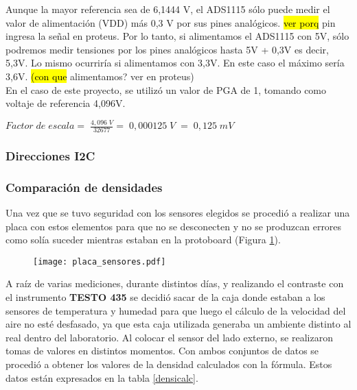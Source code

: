 Aunque la mayor referencia sea de 6,1444 V, el ADS1115 sólo puede medir el valor de alimentación (VDD) más 0,3 V por sus pines analógicos. \hl{ver porq} pin ingresa la señal en proteus. Por lo tanto, si alimentamos el ADS1115 con 5V, sólo podremos medir tensiones por los pines analógicos hasta 5V + 0,3V es decir, 5,3V. Lo mismo ocurriría si alimentamos con 3,3V. En este caso el máximo sería 3,6V. \hl{(con que} alimentamos? ver en proteus)\\
En el caso de este proyecto, se utilizó un valor de PGA de 1, tomando como voltaje de referencia 4,096V.
\begin{center}
	\begin{math}
		Factor\;de\;escala=\;\frac{4,096\;V}{32677}=\;0,000125\;V\;=\;0,125\;mV
	\end{math}
\end{center}

\subsubsection{Direcciones I2C}




\subsubsection{Comparación de densidades} \label{cap:densidades}

Una vez que se tuvo seguridad con los sensores elegidos se procedió a realizar una placa con estos elementos para que no se desconecten y no se produzcan errores como solía suceder mientras estaban en la protoboard (Figura \ref{fig:sensoresa}). \\
\begin{figure}[htb]
	\centering
	\texttt{[image: placa\_sensores.pdf]}
	\label{fig:sensoresa}
\end{figure}

A raíz de varias mediciones, durante distintos días, y realizando el contraste con el instrumento \textbf{TESTO 435} se decidió sacar de la caja donde estaban a los sensores de temperatura y humedad para que luego el cálculo de la velocidad del aire no esté desfasado, ya que esta caja utilizada generaba un ambiente distinto al real dentro del laboratorio. Al colocar el sensor del lado externo, se realizaron tomas de valores en distintos momentos. Con ambos conjuntos de datos se procedió a obtener los valores de la densidad calculados con la fórmula. Estos datos están expresados en la tabla \ref{densicalc}. 


